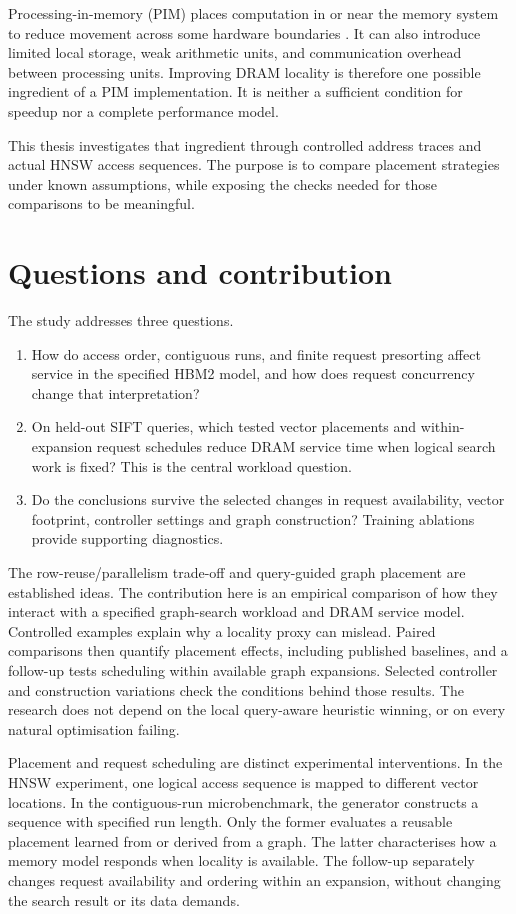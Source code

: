 \documentclass[11pt,a4paper]{report}
\begin{document}
Processing-in-memory (PIM) places computation in or near the memory system to reduce movement across some hardware boundaries \cite{primer}. It can also introduce limited local storage, weak arithmetic units, and communication overhead between processing units. Improving DRAM locality is therefore one possible ingredient of a PIM implementation. It is neither a sufficient condition for speedup nor a complete performance model.

This thesis investigates that ingredient through controlled address traces and actual HNSW access sequences. The purpose is to compare placement strategies under known assumptions, while exposing the checks needed for those comparisons to be meaningful.

\section{Questions and contribution}
The study addresses three questions.
\begin{enumerate}[label=RQ\arabic*.]
\item How do access order, contiguous runs, and finite request presorting affect service in the specified HBM2 model, and how does request concurrency change that interpretation?
\item On held-out SIFT queries, which tested vector placements and within-expansion request schedules reduce DRAM service time when logical search work is fixed? This is the central workload question.
\item Do the conclusions survive the selected changes in request availability, vector footprint, controller settings and graph construction? Training ablations provide supporting diagnostics.
\end{enumerate}

The row-reuse/parallelism trade-off and query-guided graph placement are established ideas. The contribution here is an empirical comparison of how they interact with a specified graph-search workload and DRAM service model. Controlled examples explain why a locality proxy can mislead. Paired comparisons then quantify placement effects, including published baselines, and a follow-up tests scheduling within available graph expansions. Selected controller and construction variations check the conditions behind those results. The research does not depend on the local query-aware heuristic winning, or on every natural optimisation failing.

Placement and request scheduling are distinct experimental interventions. In the HNSW experiment, one logical access sequence is mapped to different vector locations. In the contiguous-run microbenchmark, the generator constructs a sequence with specified run length. Only the former evaluates a reusable placement learned from or derived from a graph. The latter characterises how a memory model responds when locality is available. The follow-up separately changes request availability and ordering within an expansion, without changing the search result or its data demands.
\end{document}
